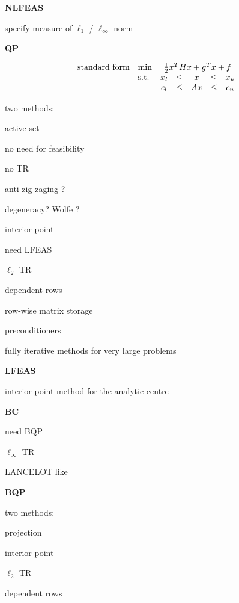 \documentclass[twoside]{article}
\newcommand{\disp}[1]{\[{#1}\]}
\newcommand{\arr}[2]{\begin{array}{#1}#2\end{array}}
\newcommand{\alist}[2]{\begin{#1}{#2}\end{#1}}
\newcommand{\ilist}[1]{\alist{itemize}{#1}}
\newcommand{\header}[1]{\vspace{5mm}

\noindent
\textbf{\large {#1}}}
\begin{document}
 \header{NLFEAS}


\ilist{
\item
   specify measure of $\ell_{1}$ / $\ell_{\infty}$ norm
}

\header{QP}

\disp{\arr{rlccccc}{
   \mbox{standard form}   & \min
                          & \multicolumn{5}{c}{\frac{1}{2} x^T H x + g^T x + f}
  \\
                          & \mbox{s.t.} & x_l & \leq &    x & \leq & x_u \\
                          &             & c_l & \leq & Ax & \leq & c_u }}


\noindent
   two methods:

\ilist{
   \item  active set
\ilist{
      \item no need for feasibility
      \item no TR
      \item anti zig-zaging ?
      \item degeneracy? Wolfe ?
}
   \item  interior point
\ilist{
      \item need LFEAS
      \item $\ell_2$ TR
      \item dependent rows
}}

\ilist{
\item
   row-wise matrix storage

\item
   preconditioners

\item
   fully iterative methods for very large problems
}

\header{LFEAS}

\ilist{
\item
   interior-point method for the analytic centre
}

\header{BC}


\ilist{
\item
   need BQP

\item
   $\ell_{\infty}$ TR

\item
   LANCELOT like
}

\header{BQP}


\noindent
   two methods:

\ilist{
 \item projection

 \item interior point
 \ilist{
      \item $\ell_2$ TR
      \item dependent rows
}}
\end{document}
